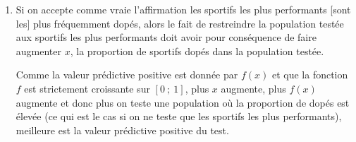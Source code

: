 \documentclass[10pt]{article}
\begin{document}
\begin{enumerate}
\begin{enumerate}
\item Si on accepte comme vraie l'affirmation \og les sportifs les plus performants [sont les] plus fréquemment dopés\fg{}, alors le fait de restreindre la population testée aux sportifs les plus performants doit avoir pour conséquence de faire augmenter $x$, la proportion de sportifs dopés dans la population testée.

Comme la valeur prédictive positive est donnée par $f(x)$ et que la fonction $f$ est strictement croissante sur $ [0~;~1] $, plus $x$ augmente, plus $f(x)$ augmente et donc plus on teste une population où la proportion de dopés est élevée (ce qui est le cas si on ne teste que les sportifs les plus performants), meilleure est la valeur prédictive positive du test.
		\end{enumerate}
	\end{enumerate}

\vspace{5mm}
\end{document}
